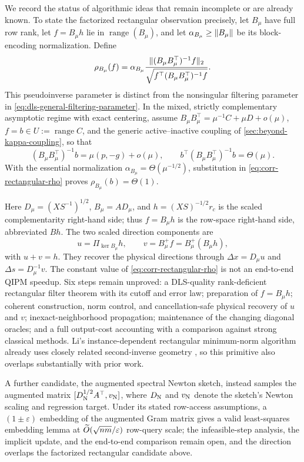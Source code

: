 We record the status of algorithmic ideas that remain incomplete or are
already known.  To state the factorized rectangular observation precisely,
let $B_\mu$ have
full row rank, let $f=B_\mu h$ lie in $\operatorname{range}(B_\mu)$, and let
$\alpha_{B_\mu}\geq\lVert B_\mu\rVert$ be its block-encoding normalization.  Define
\begin{equation}
 \rho_{B_\mu}(f)=\alpha_{B_\mu}
 \frac{\lVert(B_\mu B_\mu^\top)^{-1}f\rVert_2}
 {\sqrt{f^\top(B_\mu B_\mu^\top)^{-1}f}}.                    \label{eq:corr-rectangular-rho}
\end{equation}
This pseudoinverse parameter is distinct from the nonsingular filtering
parameter in \eqref{eq:dls-general-filtering-parameter}.  In the mixed,
strictly complementary asymptotic regime with exact centering, assume
$B_\mu B_\mu^\top=\mu^{-1}C+\mu D+o(\mu)$,
$f=b\in U:=\operatorname{range}C$, and the generic active--inactive coupling
of \cref{sec:beyond-kappa-coupling}, so that
\[
 (B_\mu B_\mu^\top)^{-1}b=\mu(p,-g)+o(\mu),
 \qquad b^\top(B_\mu B_\mu^\top)^{-1}b=\Theta(\mu).
\]
With the essential normalization
$\alpha_{B_\mu}=\Theta(\mu^{-1/2})$, substitution in
\eqref{eq:corr-rectangular-rho} proves
$\rho_{B_\mu}(b)=\Theta(1)$.

Here $D_\mu=(XS^{-1})^{1/2}$, $B_\mu=AD_\mu$, and
$h=(XS)^{-1/2}r_c$ is the scaled complementarity right-hand side; thus
$f=B_\mu h$ is the row-space right-hand side, abbreviated $Bh$.  The two
scaled direction components are
\[
 u=\Pi_{\ker B_\mu}h,
 \qquad
 v=B_\mu^+f=B_\mu^+(B_\mu h),
\]
with $u+v=h$.  They recover the physical directions through
$\Delta x=D_\mu u$ and $\Delta s=D_\mu^{-1}v$.  The
constant value of \eqref{eq:corr-rectangular-rho} is not an end-to-end QIPM
speedup.  Six steps remain unproved: a DLS-quality rank-deficient rectangular
filter theorem with its cutoff and error law; preparation of $f=B_\mu h$;
coherent construction, norm control, and cancellation-safe physical recovery
of $u$ and $v$; inexact-neighborhood propagation; maintenance of the changing
diagonal oracles; and a full output-cost accounting with a comparison against strong
classical methods.  Li's instance-dependent rectangular minimum-norm algorithm
already uses closely related second-inverse geometry
\cite{li2025-new-condition-number-application-multivariate-polynomial}, so
this primitive also overlaps substantially with prior work.

A further candidate, the augmented spectral Newton sketch, instead samples the
augmented matrix \([D_{\rm N}^{1/2}A^\top,v_{\rm N}]\), where \(D_{\rm N}\) and
\(v_{\rm N}\) denote the sketch's Newton scaling and regression target.
Under its stated row-access assumptions,
a \((1\pm\varepsilon)\) embedding of the augmented Gram matrix gives a valid
least-squares embedding lemma at
\(\widetilde{O}(\sqrt{nm}/\varepsilon)\) row-query scale; the infeasible-step
analysis, the implicit update, and the end-to-end comparison remain open,
and the direction overlaps the factorized rectangular candidate above.


